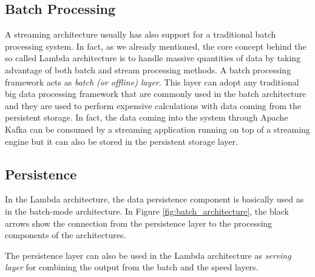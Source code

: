 \subsection{Batch Processing}
A streaming architecture usually has also support for a traditional batch processing system. In fact, as we already mentioned, the core concept behind the so called Lambda architecture is to handle massive quantities of data by taking advantage of both batch and stream processing methods. A batch processing framework acts as \emph{batch (or offline) layer}. This layer can adopt any traditional big data processing framework that are commonly used in the batch architecture and they are used to perform expensive calculations with data coming from the persistent storage. In fact, the data coming into the system through Apache Kafka can be consumed by a streaming application running on top of a streaming engine but it can also be stored in the persistent storage layer.


\subsection{Persistence}
In the Lambda architecture, the data persistence component is basically used as in the batch-mode architecture. In Figure \ref{fig:batch_architecture}, the black arrows show the connection from the persistence layer to the processing components of the architectures.

The persistence layer can also be used in the Lambda architecture as \emph{serving layer} for combining the output from the batch and the speed layers.
